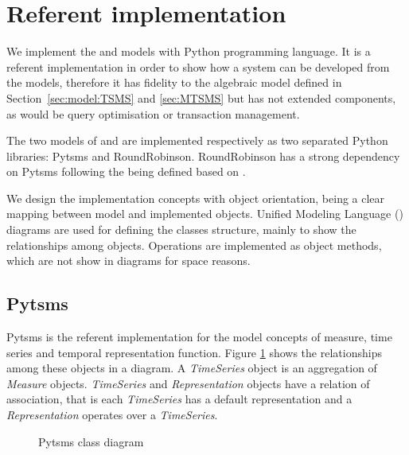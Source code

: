 

\section{Referent implementation}
\label{sec:implementation}

We implement the  and  models with Python
\cite{python:doc2} programming language. It is a referent
implementation in order to show how a system can be developed from the
models, therefore it has fidelity to the algebraic model defined in
Section~\ref{sec:model:TSMS} and \ref{sec:MTSMS} but has not extended
 components, as would be query optimisation or
transaction management.

The two models of  and  are implemented
respectively as two separated Python libraries: Pytsms and
RoundRobinson.  RoundRobinson has a strong dependency on Pytsms
following the  being defined based on .

We design the implementation concepts with object orientation, being a
clear mapping between model and implemented objects. Unified Modeling
Language () diagrams are used for defining the classes
structure, mainly to show the relationships among objects.  Operations
are implemented as object methods, which are not show in 
diagrams for space reasons.




\subsection{Pytsms}

Pytsms is the referent implementation for the model concepts of
measure, time series and temporal representation function.  Figure
\ref{fig:implementacio:pytsms-uml} shows the relationships among these
objects in a  diagram. A \emph{TimeSeries} object is an
aggregation of \emph{Measure} objects. \emph{TimeSeries} and
\emph{Representation} objects have a relation of association, that is
each \emph{TimeSeries} has a default representation and a
\emph{Representation} operates over a \emph{TimeSeries}.

\begin{figure}[tp]
  \centering
  
  \caption{Pytsms  class diagram}
  \label{fig:implementacio:pytsms-uml}
\end{figure}




